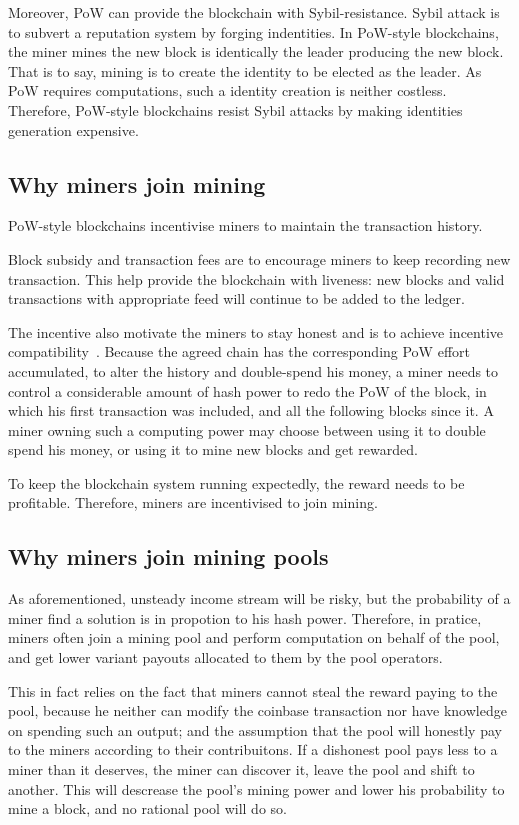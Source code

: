 Moreover, PoW can provide the blockchain with Sybil-resistance.
Sybil attack is to subvert a reputation system by forging indentities.
In PoW-style blockchains, the miner mines the new block is identically the leader producing the new block.
That is to say, mining is to create the identity to be elected as the leader.
As PoW requires computations, such a identity creation is neither costless.
Therefore, PoW-style blockchains resist Sybil attacks by making identities generation expensive.

\subsection{Why miners join mining}

PoW-style blockchains incentivise miners to maintain the transaction history.

Block subsidy and transaction fees are to encourage miners to keep recording new transaction.
This help provide the blockchain with liveness: new blocks and valid transactions with appropriate feed will continue to be added to the ledger.

The incentive also motivate the miners to stay honest and is to achieve incentive compatibility~\cite{}.
Because the agreed chain has the corresponding PoW effort accumulated, to alter the history and double-spend his money, a miner needs to control a considerable amount of hash power to redo the PoW of the block, in which his first transaction was included, and all the following blocks since it.
A miner owning such a computing power may choose between using it to double spend his money, or using it to mine new blocks and get rewarded. 

To keep the blockchain system running expectedly, the reward needs to be profitable.
Therefore, miners are incentivised to join mining.

\subsection{Why miners join mining pools}

As aforementioned, unsteady income stream will be risky, but the probability of a miner find a solution is in propotion to his hash power.
Therefore, in pratice, miners often join a mining pool and perform computation on behalf of the pool, and get lower variant payouts allocated to them by the pool operators.

This in fact relies on the fact that miners cannot steal the reward paying to the pool, because he neither can modify the coinbase transaction nor have knowledge on spending such an output;
and the assumption that the pool will honestly pay to the miners according to their contribuitons.
If a dishonest pool pays less to a miner than it deserves, the miner can discover it, leave the pool and shift to another.
This will descrease the pool's mining power and lower his probability to mine a block, and no rational pool will do so.

